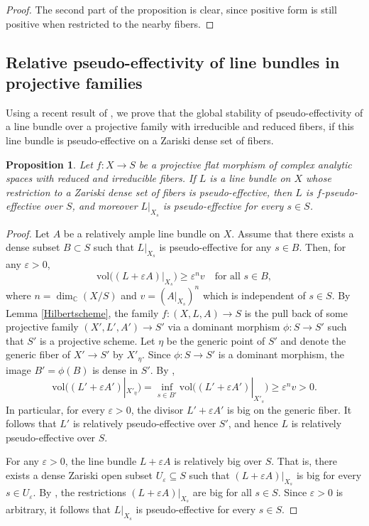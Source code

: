 \documentclass[12pt]{amsart}
\numberwithin{equation}{section}
\newtheorem{proposition}[theorem]{Proposition}
\theoremstyle{definition}
\theoremstyle{plain}
\newtheorem*{thm A*}{Theorem A}
\newtheorem*{thm B*}{Theorem B}
\newtheorem*{thm C*}{Theorem C}
\newtheorem*{thm D*}{Theorem D}
\theoremstyle{definition}
\renewcommand{\1}{\mathds{1}}
\renewcommand{\>}{\rightarrow}
\begin{document}
\begin{proof}
The second part of the proposition is clear, since positive form is still positive when restricted to the nearby fibers. 
\end{proof}
\subsection{Relative pseudo-effectivity of line bundles in projective families}
Using a recent result of \cite{Jiao}, we prove that the global stability of pseudo-effectivity of a line bundle over a projective family with irreducible and reduced fibers, if this line bundle is pseudo-effective on a Zariski dense set of fibers. 

\begin{proposition}\label{p-psefrest}
Let $f:X\to S$ be a projective flat morphism of complex analytic spaces with reduced and irreducible fibers. If $L$ is a line bundle on $X$ whose restriction to a Zariski  dense set of fibers is pseudo-effective, then $L$ is $f$-pseudo-effective over $S$, and moreover $L|_{X_s}$ is pseudo-effective for every $s \in S$. 
\end{proposition}
\begin{proof}
Let $ A $ be a relatively ample line bundle on $ X $. Assume that there exists a dense subset $ B \subset S $ such that $ L|_{X_s} $ is pseudo-effective for any $ s \in B $. Then, for any $ \varepsilon > 0 $, 
\[
\mathrm{vol}\big((L + \varepsilon A)|_{X_s}\big) \ge  \varepsilon ^nv \quad \text{for all } s \in B,
\] where $n=\dim_{\mathbb{C}} (X/S)$ and $v=(A|_{X_s})^n$ which is independent of $s\in S$.
By Lemma \ref{Hilbertscheme}, the family $f:(X,L,A)\to S$ is the pull back of some projective family $(X',L',A') \to S'$ via a dominant morphism $\phi:S\to S'$ such that $S'$ is a projective scheme. Let $\eta$ be the generic point of $S'$ and denote the generic fiber of $X' \to S'$ by $X'_{\eta}$. Since $\phi:S\to S'$ is a dominant morphism, the image $B' = \phi(B)$ is dense in $S'$. By \cite[Theorem 1.1]{Jiao},
\[
\mathrm{vol}\big((L'+\varepsilon A')|_{X'_\eta}\big) = \inf_{s\in B'} \mathrm{vol}\big((L'+\varepsilon A')|_{X'_s}\big) \ge \varepsilon ^nv >0.
\]
In particular, for every $\varepsilon > 0$, the divisor $L' + \varepsilon A'$ is big on the generic fiber. It follows that $L'$ is relatively pseudo-effective over $S'$, and hence $L$ is relatively pseudo-effective over $S$.

For any $\varepsilon > 0$, the line bundle $L + \varepsilon A$ is relatively big over $S$. That is, there exists a dense Zariski open subset $U_{\varepsilon} \subseteq S$ such that $(L+\varepsilon A)|_{X_s}$ is big for every $s \in U_{\varepsilon}$. By \cite[Proposition~4.1]{RT1}, the restrictions $(L+\varepsilon A)|_{X_s}$ are big for all $s \in S$. Since $\varepsilon > 0$ is arbitrary, it follows that $L|_{X_s}$ is pseudo-effective for every $s \in S$.
\end{proof}
\end{document}
